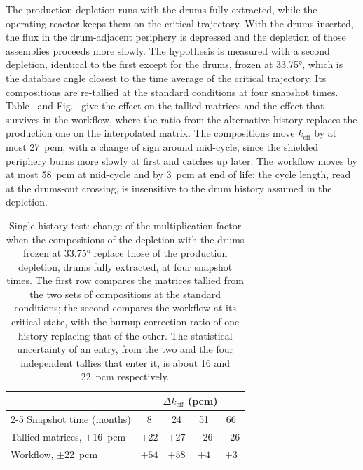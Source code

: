 The production depletion runs with the drums fully extracted, while the
operating reactor keeps them on the critical trajectory. With the drums
inserted, the flux in the drum-adjacent periphery is depressed and the
depletion of those assemblies proceeds more slowly. The hypothesis is measured with a
second depletion, identical to the first except for the drums, frozen at
\ang{33.75}, which is the database angle closest to the time average of the critical
trajectory. Its compositions are re-tallied at the standard conditions at four
snapshot times. Table~ and Fig.~ give
the effect on the tallied matrices and the effect that survives in the
workflow, where the ratio from the alternative history replaces the production
one on the interpolated matrix. The compositions move $k_{\mathrm{eff}}$ by at
most \SI{27}{pcm}, with a change of sign around mid-cycle, since the shielded
periphery burns more slowly at first and catches up later. The workflow moves
by at most \SI{58}{pcm} at mid-cycle and by \SI{3}{pcm} at end of life: the
cycle length, read at the drums-out crossing, is insensitive to the drum
history assumed in the depletion.

\begin{table}[htbp]
  \centering
  \caption[Single-history test]{Single-history test: change of the
  multiplication factor when the compositions of the depletion with the drums
  frozen at \ang{33.75} replace those of the production depletion, drums
  fully extracted, at four snapshot times. The first row compares the
  matrices tallied from the two sets of compositions at the standard
  conditions; the second compares the workflow at its critical state, with the
  burnup correction ratio of one history replacing that of the other. The
  statistical uncertainty of an entry, from the two and the four independent
  tallies that enter it, is about 16 and \SI{22}{pcm} respectively.}
  \label{cs:tab:history}
  \begin{tabular}{lcccc}
    \toprule
    & \multicolumn{4}{c}{$\Delta k_{\mathrm{eff}}$ (pcm)} \\
    \cmidrule(lr){2-5}
    Snapshot time (months) & 8 & 24 & 51 & 66 \\
    \midrule
    Tallied matrices, $\pm16$~pcm & $+22$ & $+27$ & $-26$ & $-26$ \\
    Workflow, $\pm22$~pcm         & $+54$ & $+58$ & $+4$  & $+3$  \\
    \bottomrule
  \end{tabular}
\end{table}

